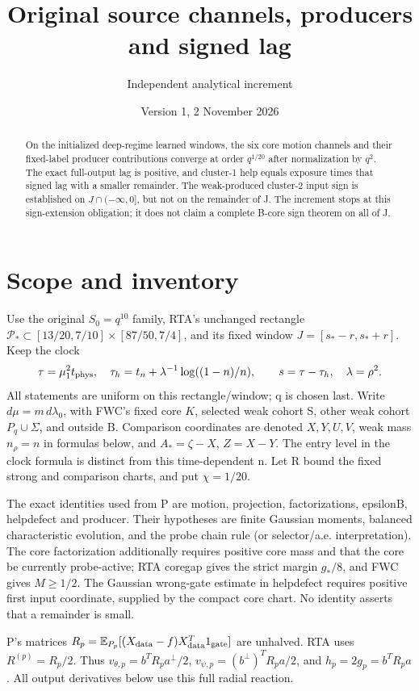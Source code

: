 \documentclass[11pt]{article}
\title{Original source channels, producers and signed lag}
\author{Independent analytical increment}\date{Version 1, 2 November 2026}
\begin{document}
\maketitle
\begin{abstract}
On the initialized deep-regime learned windows, the six core motion
channels and their fixed-label producer contributions converge at order
\(q^{1/20}\) after normalization by \(q^2\). The exact full-output lag is
positive, and cluster-1 help equals exposure times that signed lag with
a smaller remainder. The weak-produced cluster-2 input sign is established
on \(J\cap(-\infty,0]\), but not on the remainder of J. The increment stops
at this sign-extension obligation; it does not claim a complete B-core
sign theorem on all of J.
\end{abstract}
\section{Scope and inventory}\label{an01cpdv1:scope}
Use the original \(S_0=q^{10}\) family, RTA's unchanged rectangle
\(\mathcal P_*\subset[13/20,7/10]\times[87/50,7/4]\), and its fixed
window \(J=[s_*-r,s_*+r]\). Keep the clock
\[
\tau=\mu_1^2t_{\rm phys},\quad
\tau_h=t_n+\lambda^{-1}\log((1-n)/n),\qquad s=\tau-\tau_h,\quad\lambda=\rho^2.
\]
All statements are uniform on this rectangle/window; q is chosen last.
Write \(d\mu=m\,d\lambda_0\), with FWC's fixed core \(K\), selected
weak cohort S, other weak cohort \(P_q\cup\Sigma\), and outside B.
Comparison coordinates are denoted \(X,Y,U,V\), weak mass \(n_\rho=n\)
in formulas below, and \(A_*=\zeta-X\), \(Z=X-Y\).
The entry level in the clock formula is distinct from this time-dependent n.
Let R bound the fixed strong and comparison charts, and put \(\chi=1/20\).

The exact identities used from P are motion, projection, factorizations,
epsilonB, helpdefect and producer. Their hypotheses are finite Gaussian
moments, balanced characteristic evolution, and the probe chain rule
(or selector/a.e. interpretation). The core factorization additionally
requires positive core mass and that the core be currently probe-active;
RTA coregap gives the strict margin \(g_*/8\), and FWC gives \(M\ge1/2\).
The Gaussian wrong-gate estimate in helpdefect requires positive first
input coordinate, supplied by the compact core chart. No identity asserts
that a remainder is small.

P's matrices \(R_p=\mathbb E_{P_p}[(X_{\rm data}-f)X_{\rm data}^T1_{\rm gate}]\)
are unhalved. RTA uses \(R^{(p)}=R_p/2\).
Thus \(v_{\theta,p}=b^TR_pa^\perp/2\),
\(v_{\psi,p}=(b^\perp)^TR_pa/2\), and \(h_p=2g_p=b^TR_pa\).
All output derivatives below use this full radial reaction.
\end{document}
